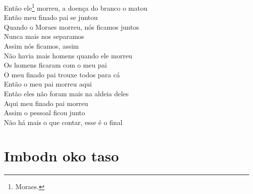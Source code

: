 \begin{linenumbers}\begingroup\raggedright
 
\noindent   Então ele\footnote{Moraes.} morreu, a doença do branco o matou\\
  Então meu finado pai se juntou\\
  Quando o Moraes morreu, nós ficamos juntos\\
  Nunca mais nos separamos\\
  Assim nós ficamos, assim\\
  Não havia mais homens quando ele morreu\\
  Os homens ficaram com o meu pai\\
  O meu finado pai trouxe todos para cá\\
  Então o meu pai morreu aqui\\
  Então eles não foram mais na aldeia deles\\
  Aqui meu finado pai morreu\\
  Assim o pessoal ficou junto\\
  Não há mais o que contar, esse é o final
\end{linenumbers}\endgroup

\chapter*{Imbodn oko taso}

